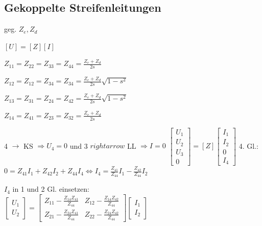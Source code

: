 \subsection{Gekoppelte Streifenleitungen}


geg. $Z_e, Z_d$

$[U] = [Z][I]$
\begin{pitemize}
    \item $Z_{11} = Z_{22} = Z_{33} = Z_{44} = \frac{Z_e + Z_d}{2s}$
    \item $Z_{12} = Z_{12} = Z_{34} = Z_{34} = \frac{Z_e + Z_d}{2s} \sqrt{1 -s^2}$
    \item $Z_{13} = Z_{31} = Z_{24} = Z_{42} = \frac{Z_e + Z_d}{2s} \sqrt{1 -s^2}$
    \item $Z_{14} = Z_{41} = Z_{23} = Z_{32} = \frac{Z_e + Z_d}{2s}$
\end{pitemize}




4 $\rightarrow$ KS $\Rightarrow U_4 = 0$ und 3 $rightarrow$ LL $\Rightarrow I = 0$
$\begin{bmatrix}
    U_1 \\ U_2 \\ U_3 \\ 0
\end{bmatrix} = [Z] \begin{bmatrix}
    I_1 \\ I_2 \\ 0 \\ I_4
\end{bmatrix}$
4. Gl.: $0 = Z_{41} I_1 + Z_{42}I_2 + Z_{44} I_4 \Leftrightarrow I_4 = \frac{Z_41}{Z_44} I_1 - \frac{Z_{42}}{Z_{44}}I_2$

$I_4$ in 1 und 2 Gl. einsetzen:\\
$\begin{bmatrix}
    U_1 \\ U_2
\end{bmatrix} =
\begin{bmatrix}
    Z_{11} - \frac{Z_{14}Z_{41}}{Z_{44}} & Z_{12} - \frac{Z_{14}Z_{42}}{Z_{44}} \\
    Z_{21} - \frac{Z_{24}Z_{41}}{Z_{44}} & Z_{22} - \frac{Z_{24}Z_{42}}{Z_{44}}
\end{bmatrix}\begin{bmatrix}
    I_1 \\ I_2
\end{bmatrix}$

